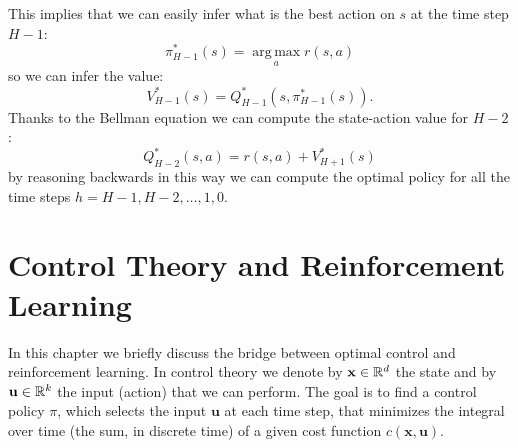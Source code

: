 \documentclass[10pt, a4paper]{report}
\begin{document}
This implies that we can easily infer what is the best action on $s$ at the time step $H-1$:\begin{equation}
    \pi^*_{H-1}(s)=\operatorname*{arg\,max}_a r(s,a)
\end{equation}
so we can infer the value:\begin{equation}
    V_{H-1}^*(s)=Q^*_{H-1}(s,\pi^*_{H-1}(s)).
\end{equation}
Thanks to the Bellman equation we can compute the state-action value for $H-2$:\begin{equation}
    Q_{H-2}^*(s,a)=r(s,a)+V^*_{H+1}(s)
\end{equation}
by reasoning backwards in this way we can compute the optimal policy for all the time steps $h=H-1,H-2,\dots , 1,0$.

\chapter{Control Theory and Reinforcement Learning}
In this chapter we briefly discuss the bridge between optimal control and reinforcement learning. In control theory we denote by $\mathbf x\in {\mathbb R}^d$ the state and by $\mathbf u\in{\mathbb R}^k$ the input (action) that we can perform. The goal is to find a control policy $\pi$, which selects the input $\mathbf u$ at each time step, that minimizes the integral over time (the sum, in discrete time) of a given cost function $c(\mathbf x,\mathbf u)$.
\end{document}
